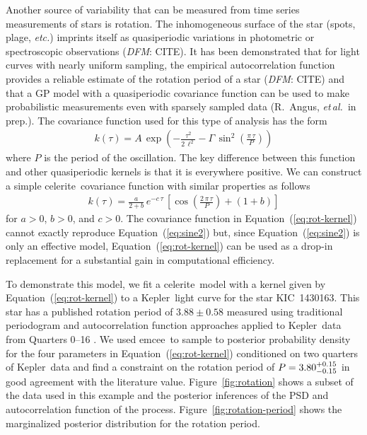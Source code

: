 \documentclass[manuscript, letterpaper]{aastex6}
\newcommand{\project}[1]{\textsf{#1}}
\newcommand{\kepler}{\project{Kepler}}
\newcommand{\celerite}{\project{celerite}}
\newcommand{\emcee}{\project{emcee}}
\newcommand{\foreign}[1]{\emph{#1}}
\newcommand{\etal}{\foreign{et\,al.}}
\newcommand{\etc}{\foreign{etc.}}
\newcommand{\figureref}[1]{\ref{fig:#1}}
\newcommand{\Figure}[1]{Figure~\figureref{#1}}
\renewcommand{\eqref}[1]{\ref{eq:#1}}
\newcommand{\Eq}[1]{Equation~(\eqref{#1})}
\newcommand{\eq}[1]{\Eq{#1}}
\newcommand{\eqlabel}[1]{\label{eq:#1}}
\newcommand{\todo}[3]{{\color{#2}\emph{#1}: #3}}
\newcommand{\dfmtodo}[1]{\todo{DFM}{red}{#1}}
\begin{document}
Another source of variability that can be measured from time series
measurements of stars is rotation.
The inhomogeneous surface of the star (spots, plage, \etc) imprints itself as
quasiperiodic variations in photometric or spectroscopic observations
(\dfmtodo{CITE}).
It has been demonstrated that for light curves with nearly uniform sampling,
the empirical autocorrelation function provides a reliable estimate of the
rotation period of a star (\dfmtodo{CITE}) and that a GP model with a
quasiperiodic covariance function can be used to make probabilistic
measurements even with sparsely sampled data (R.~Angus, \etal\ in prep.).
The covariance function used for this type of analysis has the form
\begin{eqnarray}\eqlabel{sine2}
k(\tau) = A\,\exp\left(-\frac{\tau^2}{2\,\ell^2} -
    \Gamma\,\sin^2\left(\frac{\pi\,\tau}{P} \right) \right)
\end{eqnarray}
where $P$ is the period of the oscillation.
The key difference between this function and other quasiperiodic kernels is
that it is everywhere positive.
We can construct a simple \celerite\ covariance function with similar properties
as follows
\begin{eqnarray}\eqlabel{rot-kernel}
k(\tau) = \frac{a}{2+b}\,e^{-c\,\tau}\,\left[
    \cos\left(\frac{2\,\pi\,\tau}{P}\right) + (1 + b)
\right]
\end{eqnarray}
for $a>0$, $b>0$, and $c>0$.
The covariance function in \eq{rot-kernel} cannot exactly reproduce \eq{sine2}
but, since \eq{sine2} is only an effective model, \eq{rot-kernel} can be used
as a drop-in replacement for a substantial gain in computational efficiency.

To demonstrate this model, we fit a \celerite\ model with a kernel given by
\eq{rot-kernel} to a \kepler\ light curve for the star KIC~1430163.
This star has a published rotation period of $3.88 \pm 0.58$ measured using
traditional periodogram and autocorrelation function approaches applied to
\kepler\ data from Quarters 0--16 \citep{Mathur:2014}.
We used \emcee\ to sample to posterior probability density for the four
parameters in \eq{rot-kernel} conditioned on two quarters of \kepler\ data and
find a constraint on the rotation period of $P = {3.80_{-0.15}^{+0.15} }$ in good
agreement with the literature value.
\Figure{rotation} shows a subset of the data used in this example and the
posterior inferences of the PSD and autocorrelation function of the process.
\Figure{rotation-period} shows the marginalized posterior distribution for the
rotation period.
\end{document}
